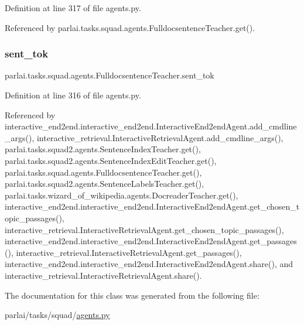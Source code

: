 Definition at line 317 of file agents.\+py.



Referenced by parlai.\+tasks.\+squad.\+agents.\+Fulldocsentence\+Teacher.\+get().

\mbox{\label{classparlai_1_1tasks_1_1squad_1_1agents_1_1FulldocsentenceTeacher_a3ad4365c2ebc8896e90e8b478eeb68ed}} 
\subsubsection{\texorpdfstring{sent\+\_\+tok}{sent\_tok}}
{\footnotesize\ttfamily parlai.\+tasks.\+squad.\+agents.\+Fulldocsentence\+Teacher.\+sent\+\_\+tok}



Definition at line 316 of file agents.\+py.



Referenced by interactive\+\_\+end2end.\+interactive\+\_\+end2end.\+Interactive\+End2end\+Agent.\+add\+\_\+cmdline\+\_\+args(), interactive\+\_\+retrieval.\+Interactive\+Retrieval\+Agent.\+add\+\_\+cmdline\+\_\+args(), parlai.\+tasks.\+squad2.\+agents.\+Sentence\+Index\+Teacher.\+get(), parlai.\+tasks.\+squad2.\+agents.\+Sentence\+Index\+Edit\+Teacher.\+get(), parlai.\+tasks.\+squad.\+agents.\+Fulldocsentence\+Teacher.\+get(), parlai.\+tasks.\+squad2.\+agents.\+Sentence\+Labels\+Teacher.\+get(), parlai.\+tasks.\+wizard\+\_\+of\+\_\+wikipedia.\+agents.\+Docreader\+Teacher.\+get(), interactive\+\_\+end2end.\+interactive\+\_\+end2end.\+Interactive\+End2end\+Agent.\+get\+\_\+chosen\+\_\+topic\+\_\+passages(), interactive\+\_\+retrieval.\+Interactive\+Retrieval\+Agent.\+get\+\_\+chosen\+\_\+topic\+\_\+passages(), interactive\+\_\+end2end.\+interactive\+\_\+end2end.\+Interactive\+End2end\+Agent.\+get\+\_\+passages(), interactive\+\_\+retrieval.\+Interactive\+Retrieval\+Agent.\+get\+\_\+passages(), interactive\+\_\+end2end.\+interactive\+\_\+end2end.\+Interactive\+End2end\+Agent.\+share(), and interactive\+\_\+retrieval.\+Interactive\+Retrieval\+Agent.\+share().



The documentation for this class was generated from the following file\+:\begin{DoxyCompactItemize}
\item 
parlai/tasks/squad/\hyperlink{parlai_2tasks_2squad_2agents_8py}{agents.\+py}\end{DoxyCompactItemize}
